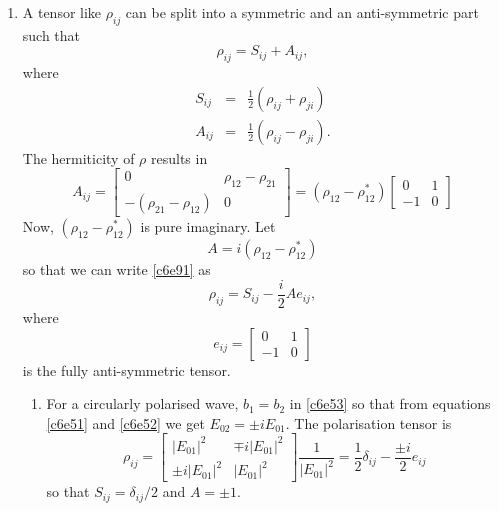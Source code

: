 \begin{enumerate}
\item A tensor like $\rho_{ij}$ can be split into a symmetric and an 
anti-symmetric part such that
\begin{equation}\label{c6e91}
\rho_{ij} = S_{ij} + A_{ij},
\end{equation}
where
\begin{eqnarray}
S_{ij} &=& \frac{1}{2}(\rho_{ij} + \rho_{ji}) \label{c6e92} \\
A_{ij} &=& \frac{1}{2}(\rho_{ij} - \rho_{ji}). \label{c6e93}
\end{eqnarray} 
The hermiticity of $\rho$ results in 
\begin{equation}\label{c6e94}
A_{ij} = \begin{bmatrix}0 & \rho_{12} - \rho_{21} \\
-(\rho_{21} - \rho_{12}) & 0
\end{bmatrix} = (\rho_{12} - \rho_{12}^\ast)
\begin{bmatrix}0 & 1 \\ -1 & 0 \end{bmatrix}
\end{equation}
Now, $(\rho_{12} - \rho_{12}^\ast)$ is pure imaginary. Let 
\begin{equation}\label{c6e95}
A = i(\rho_{12} - \rho_{12}^\ast)
\end{equation}
so that we can write \eqref{c6e91} as
\begin{equation}\label{c6e96}
\rho_{ij} = S_{ij} - \frac{i}{2}Ae_{ij},
\end{equation}
where
\begin{equation}\label{c6e97}
e_{ij} = \begin{bmatrix}0 & 1 \\ -1 & 0 \end{bmatrix}
\end{equation}
is the fully anti-symmetric tensor.
\begin{enumerate}
\item For a circularly polarised wave, $b_1 = b_2$ in \eqref{c6e53} so that from
equations \eqref{c6e51} and \eqref{c6e52} we get $E_{02} = \pm i E_{01}$. The 
polarisation tensor is
\begin{equation}\label{c6e98}
\rho_{ij} = \begin{bmatrix}|E_{01}|^2 & \mp i |E_{01}|^2 \\
\pm i |E_{01}|^2 & |E_{01}|^2
\end{bmatrix}\frac{1}{|E_{01}|^2} = 
\frac{1}{2}\delta_{ij} - \frac{\pm i}{2}e_{ij}
\end{equation}
so that $S_{ij} = \delta_{ij}/2$ and $A = \pm 1$.


\end{enumerate}
\end{enumerate}
